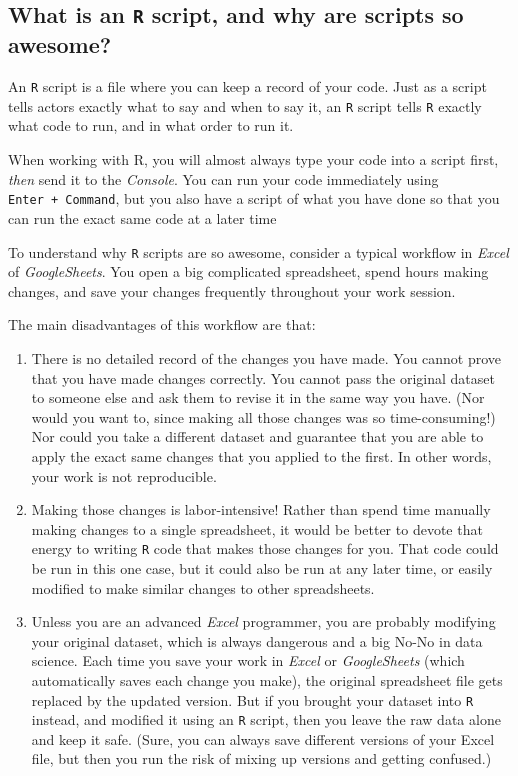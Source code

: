 \documentclass[]{book}
\begin{document}
\hypertarget{what-is-an-r-script-and-why-are-scripts-so-awesome}{%
\subsection*{\texorpdfstring{What is an \texttt{R} script, and why are scripts so awesome?}{What is an R script, and why are scripts so awesome?}}\label{what-is-an-r-script-and-why-are-scripts-so-awesome}}

An \texttt{R} script is a file where you can keep a record of your code. Just as a script tells actors exactly what to say and when to say it, an \texttt{R} script tells \texttt{R} exactly what code to run, and in what order to run it.

When working with R, you will almost always type your code into a script first, \emph{then} send it to the \emph{Console}. You can run your code immediately using \texttt{Enter\ +\ Command}, but you also have a script of what you have done so that you can run the exact same code at a later time

To understand why \texttt{R} scripts are so awesome, consider a typical workflow in \emph{Excel} of \emph{GoogleSheets}. You open a big complicated spreadsheet, spend hours making changes, and save your changes frequently throughout your work session.

The main disadvantages of this workflow are that:

\begin{enumerate}
\def\labelenumi{\arabic{enumi}.}
\item
  There is no detailed record of the changes you have made. You cannot prove that you have made changes correctly. You cannot pass the original dataset to someone else and ask them to revise it in the same way you have. (Nor would you want to, since making all those changes was so time-consuming!) Nor could you take a different dataset and guarantee that you are able to apply the exact same changes that you applied to the first. In other words, your work is not reproducible.
\item
  Making those changes is labor-intensive! Rather than spend time manually making changes to a single spreadsheet, it would be better to devote that energy to writing \texttt{R} code that makes those changes for you. That code could be run in this one case, but it could also be run at any later time, or easily modified to make similar changes to other spreadsheets.
\item
  Unless you are an advanced \emph{Excel} programmer, you are probably modifying your original dataset, which is always dangerous and a big No-No in data science. Each time you save your work in \emph{Excel} or \emph{GoogleSheets} (which automatically saves each change you make), the original spreadsheet file gets replaced by the updated version. But if you brought your dataset into \texttt{R} instead, and modified it using an \texttt{R} script, then you leave the raw data alone and keep it safe. (Sure, you can always save different versions of your Excel file, but then you run the risk of mixing up versions and getting confused.)
\end{enumerate}
\end{document}

